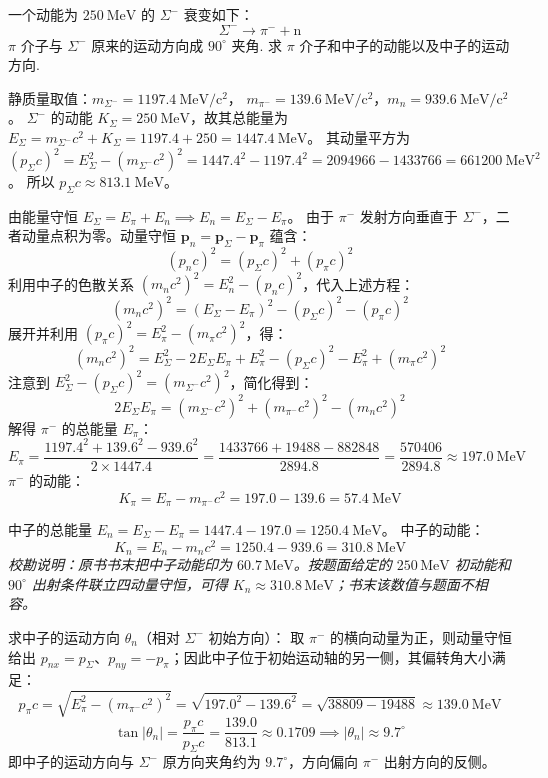 \begin{exercise}\label{ex:9.17}
一个动能为 $250 \ \mathrm{MeV}$ 的 $\Sigma^-$ 衰变如下：
$$ \Sigma^- \longrightarrow \pi^- + \mathrm{n} $$
$\pi$ 介子与 $\Sigma^-$ 原来的运动方向成 $90^\circ$ 夹角. 求 $\pi$ 介子和中子的动能以及中子的运动方向.
\end{exercise}
\begin{solution}
静质量取值：$m_{\Sigma^-} = 1197.4 \ \mathrm{MeV/c^2}$， $m_{\pi^-} = 139.6 \ \mathrm{MeV/c^2}$，$m_n = 939.6 \ \mathrm{MeV/c^2}$。
$\Sigma^-$ 的动能 $K_\Sigma = 250 \ \mathrm{MeV}$，故其总能量为 $E_\Sigma = m_{\Sigma^-} c^2 + K_\Sigma = 1197.4 + 250 = 1447.4 \ \mathrm{MeV}$。
其动量平方为 $(p_\Sigma c)^2 = E_\Sigma^2 - (m_{\Sigma^-} c^2)^2 = 1447.4^2 - 1197.4^2 = 2094966 - 1433766 = 661200 \ \mathrm{MeV^2}$。
所以 $p_\Sigma c \approx 813.1 \ \mathrm{MeV}$。

由能量守恒 $E_\Sigma = E_\pi + E_n \implies E_n = E_\Sigma - E_\pi$。
由于 $\pi^-$ 发射方向垂直于 $\Sigma^-$，二者动量点积为零。动量守恒 $\boldsymbol{p}_n = \boldsymbol{p}_\Sigma - \boldsymbol{p}_\pi$ 蕴含：
$$ (p_n c)^2 = (p_\Sigma c)^2 + (p_\pi c)^2 $$
利用中子的色散关系 $(m_n c^2)^2 = E_n^2 - (p_n c)^2$，代入上述方程：
$$ (m_n c^2)^2 = (E_\Sigma - E_\pi)^2 - (p_\Sigma c)^2 - (p_\pi c)^2 $$
展开并利用 $(p_\pi c)^2 = E_\pi^2 - (m_\pi c^2)^2$，得：
$$ (m_n c^2)^2 = E_\Sigma^2 - 2 E_\Sigma E_\pi + E_\pi^2 - (p_\Sigma c)^2 - E_\pi^2 + (m_\pi c^2)^2 $$
注意到 $E_\Sigma^2 - (p_\Sigma c)^2 = (m_{\Sigma^-} c^2)^2$，简化得到：
$$ 2 E_\Sigma E_\pi = (m_{\Sigma^-} c^2)^2 + (m_{\pi^-} c^2)^2 - (m_n c^2)^2 $$
解得 $\pi^-$ 的总能量 $E_\pi$：
$$ E_\pi = \frac{1197.4^2 + 139.6^2 - 939.6^2}{2 \times 1447.4} = \frac{1433766 + 19488 - 882848}{2894.8} = \frac{570406}{2894.8} \approx 197.0 \ \mathrm{MeV} $$
$\pi^-$ 的动能：
$$ K_\pi = E_\pi - m_{\pi^-} c^2 = 197.0 - 139.6 = 57.4 \ \mathrm{MeV} $$

中子的总能量 $E_n = E_\Sigma - E_\pi = 1447.4 - 197.0 = 1250.4 \ \mathrm{MeV}$。
中子的动能：
$$ K_n = E_n - m_n c^2 = 1250.4 - 939.6 = 310.8 \ \mathrm{MeV} $$
\textit{校勘说明：原书书末把中子动能印为 $60.7\,\mathrm{MeV}$。按题面给定的 $250\,\mathrm{MeV}$ 初动能和 $90^\circ$ 出射条件联立四动量守恒，可得 $K_n\approx310.8\,\mathrm{MeV}$；书末该数值与题面不相容。}

求中子的运动方向 $\theta_n$（相对 $\Sigma^-$ 初始方向）：
取 $\pi^-$ 的横向动量为正，则动量守恒给出 $p_{nx}=p_\Sigma$、$p_{ny}=-p_\pi$；因此中子位于初始运动轴的另一侧，其偏转角大小满足：
$$ p_\pi c = \sqrt{E_\pi^2 - (m_{\pi^-} c^2)^2} = \sqrt{197.0^2 - 139.6^2} = \sqrt{38809 - 19488} \approx 139.0 \ \mathrm{MeV} $$
$$ \tan|\theta_n| = \frac{p_\pi c}{p_\Sigma c} = \frac{139.0}{813.1} \approx 0.1709 \implies |\theta_n| \approx 9.7^\circ $$
即中子的运动方向与 $\Sigma^-$ 原方向夹角约为 $9.7^\circ$，方向偏向 $\pi^-$ 出射方向的反侧。
\end{solution}

